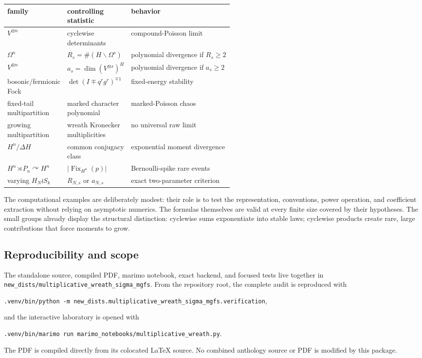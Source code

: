 \documentclass[10pt]{article}
\newcommand{\Fix}{\operatorname{Fix}}
\begin{document}
\begin{center}
\small
\begin{tabularx}{\linewidth}{>{\raggedright\arraybackslash}p{0.25\linewidth}
>{\raggedright\arraybackslash}p{0.29\linewidth}X}
\toprule
family & controlling statistic & behavior\\
\midrule
$V^{\oplus n}$ & cyclewise determinants & compound-Poisson limit\\
$\Omega^n$ & $R_s=\#(H\backslash\Omega^s)$ & polynomial divergence if $R_s\ge2$\\
$V^{\otimes n}$ & $a_s=\dim(V^{\otimes s})^H$ & polynomial divergence if $a_s\ge2$\\
bosonic/fermionic Fock & $\det(I\mp q^rg^r)^{\mp1}$ & fixed-energy stability\\
fixed-tail multipartition & marked character polynomial & marked-Poisson chaos\\
growing multipartition & wreath Kronecker multiplicities & no universal raw limit\\
$H^n/\Delta H$ & common conjugacy class & exponential moment divergence\\
$H^n\rtimes P_n\curvearrowright H^n$ & $|\Fix_{H^n}(p)|$ & Bernoulli-spike rare events\\
varying $H_N\wr S_k$ & $R_{N,s}$ or $a_{N,s}$ & exact two-parameter criterion\\
\bottomrule
\end{tabularx}
\end{center}

The computational examples are deliberately modest: their role is to test
the representation, conventions, power operation, and coefficient extraction
without relying on asymptotic numerics.  The formulas themselves are valid at
every finite size covered by their hypotheses.  The small groups already
display the structural distinction: cyclewise sums exponentiate into stable
laws; cyclewise products create rare, large contributions that force moments
to grow.

\subsection{Reproducibility and scope}
\thispagestyle{fancy}

The standalone source, compiled PDF, marimo notebook, exact backend, and
focused tests live together in
\texttt{new\_dists/multiplicative\_wreath\_sigma\_mgfs}.  From the repository
root, the complete audit is reproduced with
\begin{center}
\texttt{.venv/bin/python -m
new\_dists.multiplicative\_wreath\_sigma\_mgfs.verification},
\end{center}
and the interactive laboratory is opened with
\begin{center}
\texttt{.venv/bin/marimo run
marimo\_notebooks/multiplicative\_wreath.py}.
\end{center}
The PDF is compiled directly from its colocated \LaTeX{} source.  No combined
anthology source or PDF is modified by this package.
\end{document}
